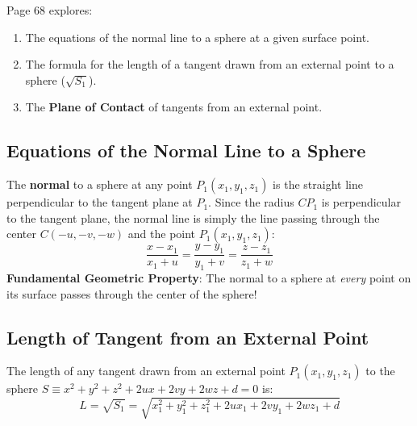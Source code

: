 \begin{conceptbox}
Page 68 explores:
\begin{enumerate}[noitemsep]
    \item The equations of the normal line to a sphere at a given surface point.
    \item The formula for the length of a tangent drawn from an external point to a sphere ($\sqrt{S_1}$).
    \item The \textbf{Plane of Contact} of tangents from an external point.
\end{enumerate}
\end{conceptbox}

\subsection{Equations of the Normal Line to a Sphere}
The \textbf{normal} to a sphere at any point $P_1(x_1, y_1, z_1)$ is the straight line perpendicular to the tangent plane at $P_1$.
Since the radius $C P_1$ is perpendicular to the tangent plane, the normal line is simply the line passing through the center $C(-u, -v, -w)$ and the point $P_1(x_1, y_1, z_1)$:
\begin{equation}
    \boxed{\frac{x - x_1}{x_1 + u} = \frac{y - y_1}{y_1 + v} = \frac{z - z_1}{z_1 + w}}
\end{equation}
\textbf{Fundamental Geometric Property}: The normal to a sphere at \emph{every} point on its surface passes through the center of the sphere!

\subsection{Length of Tangent from an External Point}
\begin{theorembox}
The length of any tangent drawn from an external point $P_1(x_1, y_1, z_1)$ to the sphere $S \equiv x^2 + y^2 + z^2 + 2ux + 2vy + 2wz + d = 0$ is:
\begin{equation}
    \boxed{L = \sqrt{S_1} = \sqrt{x_1^2 + y_1^2 + z_1^2 + 2ux_1 + 2vy_1 + 2wz_1 + d}}
\end{equation}
\end{theorembox}

